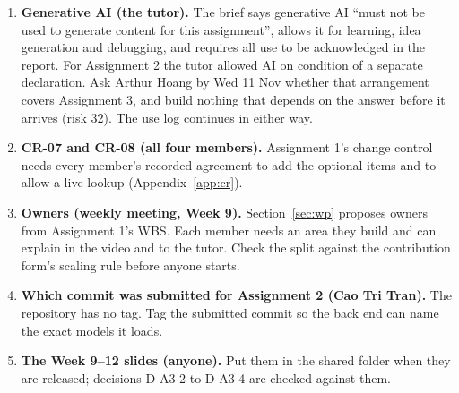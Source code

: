 \begin{team}
\begin{enumerate}
  \item \textbf{Generative AI (the tutor).} The brief says generative AI ``must not be used to
    generate content for this assignment'', allows it for learning, idea generation and debugging,
    and requires all use to be acknowledged in the report. For Assignment 2 the tutor allowed AI on
    condition of a separate declaration. Ask Arthur Hoang by Wed 11 Nov whether that arrangement
    covers Assignment 3, and build nothing that depends on the answer before it arrives
    (risk 32). The use log continues in  either way.
  \item \textbf{CR-07 and CR-08 (all four members).} Assignment 1's change control needs every
    member's recorded agreement to add the optional items and to allow a live lookup
    (Appendix~\ref{app:cr}).
  \item \textbf{Owners (weekly meeting, Week 9).} Section~\ref{sec:wp} proposes owners from
    Assignment 1's WBS. Each member needs an area they build and can explain in the video and to the
    tutor. Check the split against the contribution form's scaling rule before anyone starts.
  \item \textbf{Which commit was submitted for Assignment 2 (Cao Tri Tran).} The repository has no
     tag. Tag the submitted commit so the back end can name the exact models it loads.
  \item \textbf{The Week 9--12 slides (anyone).} Put them in the shared folder when they are
    released; decisions D-A3-2 to D-A3-4 are checked against them.
\end{enumerate}
\end{team}

